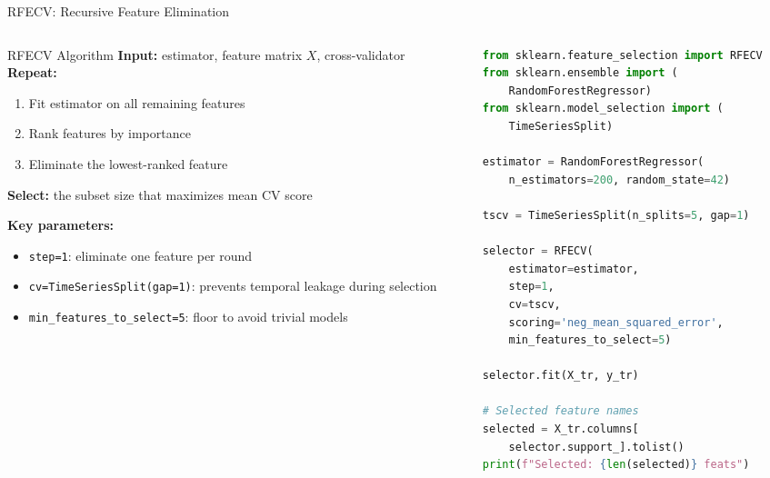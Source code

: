 \documentclass[aspectratio=169, 10pt]{beamer}
\begin{document}
\begin{frame}[fragile]{RFECV: Recursive Feature Elimination}
  \begin{columns}[T]
    \begin{column}{0.49\textwidth}
      \begin{definitionbox}{RFECV Algorithm}
        \footnotesize
        \textbf{Input:} estimator, feature matrix $X$,
        cross-validator\\[3pt]
        \textbf{Repeat:}
        \begin{enumerate}
          \item Fit estimator on all remaining features
          \item Rank features by importance
          \item Eliminate the lowest-ranked feature
        \end{enumerate}
        \textbf{Select:} the subset size that maximizes
        mean CV score \parencite{Guyon2003}
      \end{definitionbox}

      \textbf{Key parameters:}
      \begin{itemize}
        \item \texttt{step=1}: eliminate one feature
              per round
        \item \texttt{cv=TimeSeriesSplit(gap=1)}:
              prevents temporal leakage during selection
        \item \texttt{min\_features\_to\_select=5}:
              floor to avoid trivial models
      \end{itemize}
    \end{column}
    \begin{column}{0.48\textwidth}
\begin{lstlisting}[language=Python,
                   basicstyle=\tiny\ttfamily]
from sklearn.feature_selection import RFECV
from sklearn.ensemble import (
    RandomForestRegressor)
from sklearn.model_selection import (
    TimeSeriesSplit)

estimator = RandomForestRegressor(
    n_estimators=200, random_state=42)

tscv = TimeSeriesSplit(n_splits=5, gap=1)

selector = RFECV(
    estimator=estimator,
    step=1,
    cv=tscv,
    scoring='neg_mean_squared_error',
    min_features_to_select=5)

selector.fit(X_tr, y_tr)

# Selected feature names
selected = X_tr.columns[
    selector.support_].tolist()
print(f"Selected: {len(selected)} feats")
\end{lstlisting}
    \end{column}
  \end{columns}
\end{frame}
\end{document}
